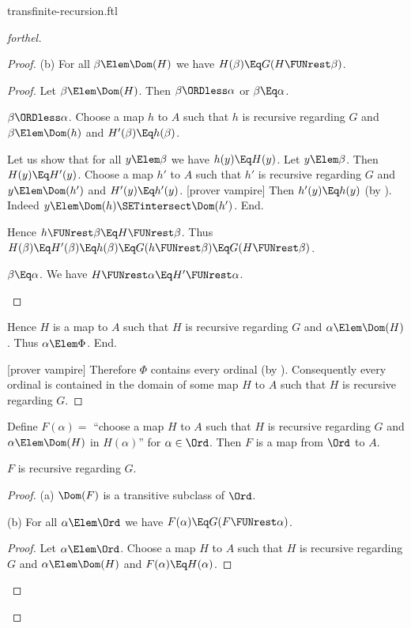 \documentclass{stex}
\begin{document}
\begin{smodule}{transfinite-recursion.ftl}
\begin{proof}[forthel]
\begin{proof}
      (b) For all $\beta \Elem \Dom(H)$ we have $H(\beta) \Eq G(H \FUNrest \beta)$.
      \begin{proof}
        Let $\beta \Elem \Dom(H)$.
        Then $\beta \ORDless \alpha$ or $\beta \Eq \alpha$.

        \begin{case}{$\beta \ORDless \alpha$.}
          Choose a map $h$ to $A$ such that $h$ is recursive regarding $G$ and $\beta \Elem \Dom(h)$ and $H'(\beta) \Eq h(\beta)$.

          Let us show that for all $y \Elem \beta$ we have $h(y) \Eq H(y)$.
            Let $y \Elem \beta$.
            Then $H(y) \Eq H'(y)$.
            Choose a map $h'$ to $A$ such that $h'$ is recursive regarding $G$ and $y \Elem \Dom(h')$ and $H'(y) \Eq h'(y)$.
            [prover vampire]
            Then $h'(y) \Eq h(y)$ (by ).
            Indeed $y \Elem \Dom(h) \SETintersect \Dom(h')$.
          End.

          Hence $h \FUNrest \beta \Eq H \FUNrest \beta$.
          Thus $H(\beta)
            \Eq H'(\beta)
            \Eq h(\beta)
            \Eq G(h \FUNrest \beta)
            \Eq G(H \FUNrest \beta)$.
        \end{case}

        \begin{case}{$\beta \Eq \alpha$.}
          We have $H \FUNrest \alpha \Eq H' \FUNrest \alpha$.
        \end{case}
      \end{proof}

      Hence $H$ is a map to $A$ such that $H$ is recursive regarding $G$ and $\alpha \Elem \Dom(H)$.
      Thus $\alpha \Elem \Phi$.
    End.

    [prover vampire]
    Therefore $\Phi$ contains every ordinal (by ).
    Consequently every ordinal is contained in the domain of some map $H$ to $A$ such that $H$ is recursive regarding $G$.
  \end{proof}

  Define $F(\alpha) =$ ``choose a map $H$ to $A$ such that $H$ is recursive regarding $G$ and $\alpha \Elem \Dom(H)$ in $H(\alpha)$'' for $\alpha \in \Ord$.
  Then $F$ is a map from $\Ord$ to $A$.

  $F$ is recursive regarding $G$.
  \begin{proof}
    (a) $\Dom(F)$ is a transitive subclass of $\Ord$.

    (b) For all $\alpha \Elem \Ord$ we have $F(\alpha) \Eq G(F \FUNrest \alpha)$.
    \begin{proof}
      Let $\alpha \Elem \Ord$.
      Choose a map $H$ to $A$ such that $H$ is recursive regarding $G$ and $\alpha \Elem \Dom(H)$ and $F(\alpha) \Eq H(\alpha)$.


\end{proof}
\end{proof}
\end{proof}
\end{smodule}
\end{document}
